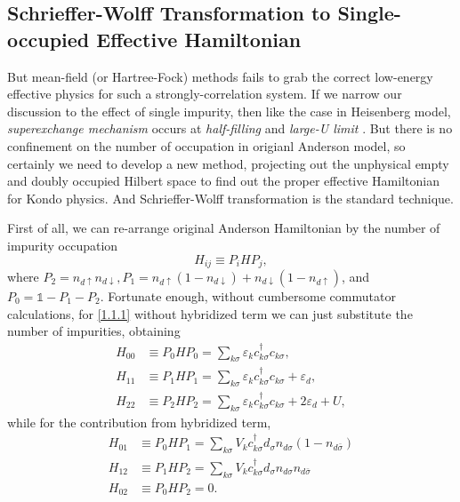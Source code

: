 \documentclass[aps,prx,superscriptaddress,onecolumn,preprintnumbers,nofootinbib,longbibliography]{revtex4-1}
\begin{document}
	\subsection{Schrieffer-Wolff Transformation to Single-occupied Effective Hamiltonian}
		But mean-field (or Hartree-Fock) methods fails to grab the correct low-energy effective physics for such a strongly-correlation system. If we narrow our discussion to the effect of single impurity, then like the case in Heisenberg model, \emph{superexchange mechanism} occurs at \emph{half-filling} and \emph{large-U limit} \cite{Fradkin2013Field,altland2010condensed}. But there is no confinement on the number of occupation in origianl Anderson model, so certainly we need to develop a new method, projecting out the unphysical empty and doubly occupied Hilbert space to find out the proper effective Hamiltonian for Kondo physics. And Schrieffer-Wolff transformation \cite{schrieffer1966relation} is the standard technique.\par
		First of all, we can re-arrange original Anderson Hamiltonian by the number of impurity occupation
		\begin{equation*}
			H_{ij}\equiv P_iHP_j,
		\end{equation*}
		where $P_2=n_{d\uparrow}n_{d\downarrow}, P_1=n_{d\uparrow}(1-n_{d\downarrow})+n_{d\downarrow}(1-n_{d\uparrow})$, and $P_0=\mathds{1}-P_1-P_2$. Fortunate enough, without cumbersome commutator calculations, for \eqref{1.1.1} without hybridized term we can just substitute the number of impurities, obtaining
		\begin{subequations}
			\begin{align}
				H_{00}&\equiv P_0HP_0=\sum_{k \sigma}\varepsilon_{k}c_{k\sigma}^\dagger c_{k\sigma},\label{1.2.1a}\\
				H_{11}&\equiv P_1HP_1=\sum_{k \sigma}\varepsilon_{k}c_{k\sigma}^\dagger c_{k\sigma}+\varepsilon_d,\label{1.2.1b}\\
				H_{22}&\equiv P_2HP_2=\sum_{k \sigma}\varepsilon_{k}c_{k\sigma}^\dagger c_{k\sigma}+2 \varepsilon_d+U,\label{1.2.1c}
			\end{align}
		\end{subequations}
		while for the contribution from hybridized term,
		\begin{subequations}
			\begin{align}
				H_{01}&\equiv P_0HP_1=\sum_{k\sigma}V_kc_{k\sigma}^\dagger d_\sigma n_{d\sigma}(1-n_{d\bar{\sigma}})\label{1.2.2a}\\
				H_{12}&\equiv P_1HP_2=\sum_{k\sigma}V_kc_{k\sigma}^\dagger d_\sigma n_{d\sigma}n_{d\bar{\sigma}}\label{1.2.2b}\\
				H_{02}&\equiv P_0HP_2=0\label{1.2.2c}.
			\end{align}
		\end{subequations}
\end{document}
